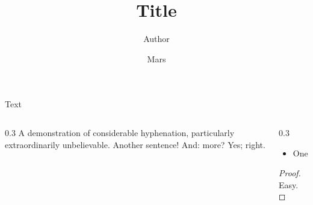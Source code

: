 \documentclass{beamer}
\title{Title}
\author{Author}
\date{Mars}
\begin{document}
\begin{frame}
\titlepage
\end{frame}
\begin{frame}{Text}
\begin{columns}
\begin{column}{0.3\textwidth}
A demonstration of considerable hyphenation, particularly extraordinarily unbelievable. Another sentence! And: more? Yes; right.
\end{column}
\begin{column}{0.3\textwidth}
\begin{itemize}
\item One
\end{itemize}
\begin{proof}Easy.\end{proof}
\end{column}
\end{columns}
\end{frame}
\end{document}
